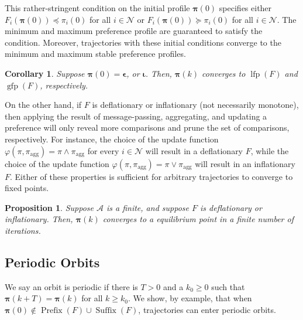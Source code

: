 \documentclass[conference]{ieeeconf}
\newcommand{\N}{\mathcal{N}}
\newcommand{\A}{\mathcal{A}}
\newcommand{\profile}{\boldsymbol{\pi}}
\newcommand{\join}{\vee}
\newcommand{\meet}{\wedge}
\renewcommand{\geq}{\geqslant}
\DeclareMathOperator{\Pre}{Prefix}
\DeclareMathOperator{\Post}{Suffix}
\DeclareMathOperator{\lfp}{lfp}
\DeclareMathOperator{\gfp}{gfp}
\newtheorem{corollary}{Corollary}
\newtheorem{proposition}{Proposition}
\begin{document}
This rather-stringent condition on the initial profile $\profile(0)$ specifies either $F_i(\profile(0)) \preceq \pi_i(0)$ for all $i \in \N$ or $F_i(\profile(0)) \succeq \pi_i(0)$ for all $i \in \N$. The minimum and maximum preference profile are guaranteed to satisfy the condition. Moreover, trajectories with these initial conditions converge to the minimum and maximum stable preference profiles.

\begin{corollary}
    Suppose $\profile(0) = \boldsymbol{\epsilon}$, or $\boldsymbol{\iota}$. Then, $\profile(k)$ converges to $\lfp(F)$ and $\gfp(F)$, respectively.
\end{corollary}

On the other hand, if $F$ is deflationary or inflationary (not necessarily monotone), then applying the result of message-passing, aggregating, and updating a preference will only reveal more comparisons and prune the set of comparisons, respectively. For instance, the choice of the update function $\varphi(\pi,\pi_{\text{agg}}) = \pi \meet \pi_{\text{agg}}$ for every $i \in \N$ will result in a deflationary $F$, while the choice of the update function 
$\varphi(\pi,\pi_{\text{agg}}) = \pi \join \pi_{\text{agg}}$ will result in an inflationary $F$. Either of these properties is sufficient for arbitrary trajectories to converge to fixed points.

\begin{proposition}
     Suppose $\A$ is a finite, and suppose $F$ is deflationary or inflationary. Then, $\profile(k)$ converges to a equilibrium point in a finite number of iterations.
\end{proposition}

\subsection{Periodic Orbits}
We say an orbit is periodic if there is $T>0$ and a $k_0 \geq 0$ such that $\profile(k+T) = \profile(k)$ for all $k \geq k_0$. We show, by example, that when $\profile(0) \notin \Pre(F) \cup \Post(F)$, trajectories can enter periodic orbits.
\end{document}

